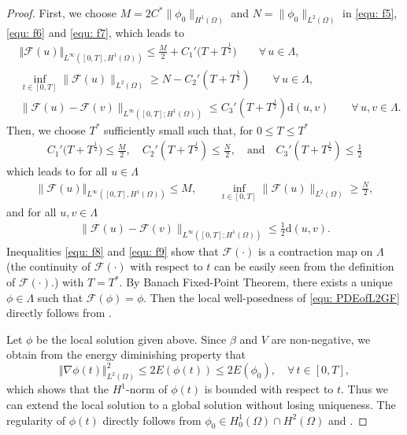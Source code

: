 \documentclass{siamart250211}
\begin{document}
\begin{proof}
First, we choose $M = 2 C^* \|\phi_0\|_{H^1(\Omega)}$ and $N = \|\phi_0\|_{L^2(\Omega)}$ in \eqref{equ: f5}, \eqref{equ: f6} and \eqref{equ: f7}, which leads to 
\begin{align}
    &\Vert \mathcal{F}(u)\Vert_{ L^\infty([0,T],H^1(\Omega))}\leq \frac{M}{2}+C_1'\Big(T+T^{\frac{1}{2}}\Big) \qquad \forall\, u \in \Lambda, \\
    &\inf_{t \in [0,T]} \|\mathcal{F}(u)\|_{L^2(\Omega)} \ge N - C_2'(T + T^{\frac12}) \qquad \forall\, u \in \Lambda, \\
    & \|\mathcal{F}(u) - \mathcal{F}(v)\|_{L^\infty([0,T];H^1(\Omega))} \le C_3'(T + T^{\frac12}) \text{d}(u,v) \qquad \forall\, u,v \in \Lambda.
\end{align}
Then, we choose $T^*$ sufficiently small such that, for $0 \le T \le T^*$
\begin{align*}
    C_1'\Big(T+T^{\frac{1}{2}}\Big)  \le \frac{M}{2}, \quad
    C_2'(T + T^{\frac12}) \le \frac{N}{2}, \quad 
    \text{and} \quad C_3'(T + T^{\frac12})  \le \frac12
\end{align*}
which leads to for all $u \in \Lambda$
\begin{align}
    \|\mathcal{F}(u)\Vert_{ L^\infty([0,T],H^1(\Omega))}\leq M, \qquad \inf_{t \in [0,T]} \|\mathcal{F}(u)\|_{L^2(\Omega)} \ge \frac{N}{2}, \label{equ: f8}
\end{align}
and for all $u,v \in \Lambda$
\begin{align}
    \|\mathcal{F}(u) - \mathcal{F}(v)\|_{L^\infty([0,T];H^1(\Omega))} \le \frac12 \text{d}(u,v). \label{equ: f9}
\end{align}
Inequalities \eqref{equ: f8} and \eqref{equ: f9} show that $\mathcal{F}(\cdot)$ is a contraction map on $\Lambda$ (the continuity of $\mathcal{F}(\cdot)$ with respect to $t$ can be easily seen from the definition of $\mathcal{F}(\cdot)$.) with $T = T^*$. By Banach Fixed-Point Theorem, there exists a unique $\phi \in \Lambda$ such that $\mathcal{F}(\phi) = \phi$. Then the local well-posedness of \eqref{equ: PDEofL2GF} directly follows from \cite[Proposition 2.2]{antonelli2024existence}.  
    
Let $\phi$ be the local solution given above. Since $\beta$ and $V$ are non-negative, we obtain from the energy diminishing property that 
\begin{equation}
    \Vert\nabla \phi(t)\Vert_{L^2(\Omega)}^2\leq2E(\phi(t))\leq2E(\phi_0), \hspace{1em}\forall\, t\in [0,T],
\end{equation}
which shows that the $H^1$-norm of $\phi(t)$ is bounded with respect to $t$. Thus we can extend the local solution to a global solution without losing uniqueness. The regularity of $\phi(t)$ directly follows from $\phi_0 \in H_0^1(\Omega) \cap H^2(\Omega)$ and \cite[Propositions 2.2 and 3.4]{antonelli2024existence}.


\end{proof}
\end{document}
